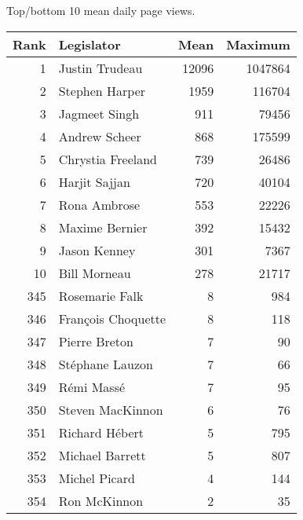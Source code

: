 \centering
\caption{Top/bottom 10 mean daily page views.\label{tab:pageviewstopcan}} 
\begingroup\scriptsize
\begin{tabular}{rlrr}
  \toprule
Rank & Legislator & Mean & Maximum \\ 
  \midrule
1 & Justin Trudeau & 12096 & 1047864 \\ 
  2 & Stephen Harper & 1959 & 116704 \\ 
  3 & Jagmeet Singh & 911 & 79456 \\ 
  4 & Andrew Scheer & 868 & 175599 \\ 
  5 & Chrystia Freeland & 739 & 26486 \\ 
   \midrule
6 & Harjit Sajjan & 720 & 40104 \\ 
  7 & Rona Ambrose & 553 & 22226 \\ 
  8 & Maxime Bernier & 392 & 15432 \\ 
  9 & Jason Kenney & 301 & 7367 \\ 
  10 & Bill Morneau & 278 & 21717 \\ 
   \midrule
345 & Rosemarie Falk & 8 & 984 \\ 
  346 & François Choquette & 8 & 118 \\ 
  347 & Pierre Breton & 7 & 90 \\ 
  348 & Stéphane Lauzon & 7 & 66 \\ 
  349 & Rémi Massé & 7 & 95 \\ 
   \midrule
350 & Steven MacKinnon & 6 & 76 \\ 
  351 & Richard Hébert & 5 & 795 \\ 
  352 & Michael Barrett & 5 & 807 \\ 
  353 & Michel Picard & 4 & 144 \\ 
  354 & Ron McKinnon & 2 & 35 \\ 
   \bottomrule
\end{tabular}
\endgroup
